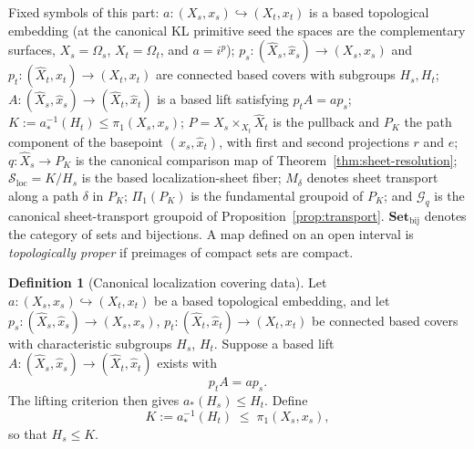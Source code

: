 \documentclass[11pt,reqno]{amsart}
\theoremstyle{definition}
\newtheorem{definition}[theorem]{Definition}
\theoremstyle{remark}
\begin{document}
Fixed symbols of this part:
\( a\colon(X_s,x_s)\hookrightarrow(X_t,x_t) \) is a based topological
embedding (at the canonical KL primitive seed the spaces are the
complementary surfaces, \( X_s=\Omega_s \), \( X_t=\Omega_t \), and
\( a=i^{p} \));
\( p_s\colon(\widehat X_s,\widehat x_s)\to(X_s,x_s) \) and
\( p_t\colon(\widehat X_t,\widehat x_t)\to(X_t,x_t) \) are connected based
covers with subgroups \( H_s,H_t \);
\( A\colon(\widehat X_s,\widehat x_s)\to(\widehat X_t,\widehat x_t) \) is a
based lift satisfying \( p_tA=ap_s \);
\( K:=a_*^{-1}(H_t)\leq\pi_1(X_s,x_s) \);
\( P=X_s\times_{X_t}\widehat X_t \) is the pullback and \( P_K \) the path
component of the basepoint \( (x_s,\widehat x_t) \), with first and second
projections \( r \) and \( e \);
\( q\colon\widehat X_s\to P_K \) is the canonical comparison map of
Theorem~\ref{thm:sheet-resolution};
\( \mathcal S_{\mathrm{loc}}=K/H_s \) is the based localization-sheet
fiber;
\( M_\delta \) denotes sheet transport along a path \( \delta \) in
\( P_K \); \( \Pi_1(P_K) \) is the fundamental groupoid of \( P_K \); and
\( \mathcal G_q \) is the canonical sheet-transport groupoid of
Proposition~\ref{prop:transport}.  \( \mathbf{Set}_{\mathrm{bij}} \)
denotes the category of sets and bijections.  A map defined on an open
interval is \emph{topologically proper} if preimages of compact sets are
compact.

\begin{definition}[Canonical localization covering data]\label{def:loc-data}
Let \( a\colon(X_s,x_s)\hookrightarrow(X_t,x_t) \) be a based topological
embedding, and let
\( p_s\colon(\widehat X_s,\widehat x_s)\to(X_s,x_s) \),
\( p_t\colon(\widehat X_t,\widehat x_t)\to(X_t,x_t) \)
be connected based covers with characteristic subgroups \( H_s \),
\( H_t \).  Suppose a based lift
\( A\colon(\widehat X_s,\widehat x_s)\to(\widehat X_t,\widehat x_t) \)
exists with
\begin{equation}\label{eq:lift-square}
  p_t A = a p_s .
\end{equation}
The lifting criterion then gives \( a_*(H_s)\leq H_t \).  Define
\begin{equation}\label{eq:K-def}
  K := a_*^{-1}(H_t)\;\leq\;\pi_1(X_s,x_s),
\end{equation}
so that \( H_s\leq K \).
\end{definition}
\end{document}
